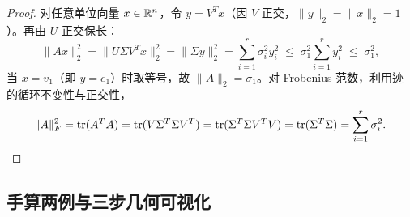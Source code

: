 \begin{proof}
对任意单位向量 $x \in \mathbb{R}^n$，令 $y = V^T x$（因 $V$ 正交，$\|y\|_2 = \|x\|_2 = 1$）。再由 $U$ 正交保长：
\[
  \|Ax\|_2^2 = \|U\Sigma V^T x\|_2^2 = \|\Sigma y\|_2^2 = \sum_{i=1}^r \sigma_i^2 y_i^2 \;\le\; \sigma_1^2 \sum_{i=1}^r y_i^2 \;\le\; \sigma_1^2,
\]
当 $x = v_1$（即 $y = e_1$）时取等号，故 $\|A\|_2 = \sigma_1$。对 Frobenius 范数，利用迹的循环不变性与正交性，
\[
  \|A\|_F^2 = \operatorname{tr}(A^T A) = \operatorname{tr}(V \Sigma^T \Sigma V^T) = \operatorname{tr}(\Sigma^T \Sigma V^T V) = \operatorname{tr}(\Sigma^T \Sigma) = \sum_{i=1}^r \sigma_i^2.
\]
\end{proof}

\subsection{手算两例与三步几何可视化}

